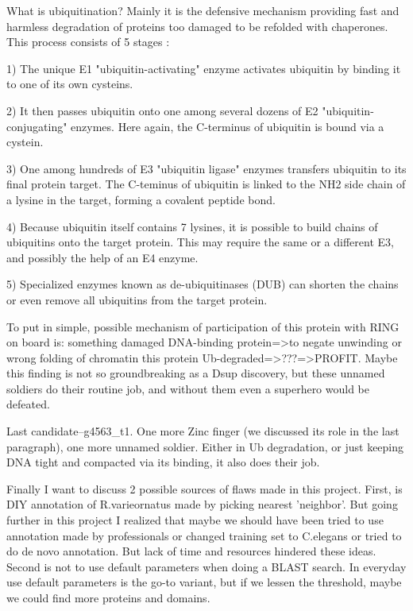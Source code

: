 \documentclass{article}
\begin{document}
 What is ubiquitination? Mainly it is the defensive mechanism providing fast and harmless degradation of proteins too damaged to be refolded with chaperones. This process consists of 5 stages \cite{7}:
 
 1) The unique E1 "ubiquitin-activating" enzyme activates ubiquitin by binding it to one of its own cysteins.
 
 2) It then passes ubiquitin onto one among several dozens of E2 "ubiquitin-conjugating" enzymes. Here again, the C-terminus of ubiquitin is bound via a cystein.
 
 3) One among hundreds of E3 "ubiquitin ligase" enzymes transfers ubiquitin to its final protein target. The C-teminus of ubiquitin is linked to the NH2 side chain of a lysine in the target, forming a covalent peptide bond.
 
 4) Because ubiquitin itself contains 7 lysines, it is possible to build chains of ubiquitins onto the target protein. This may require the same or a different E3, and possibly the help of an E4 enzyme.
 
 5) Specialized enzymes known as de-ubiquitinases (DUB) can shorten the chains or even remove all ubiquitins from the target protein.
 
 To put in simple, possible mechanism of participation of this protein with RING on board is: something damaged DNA-binding protein=>to negate unwinding or wrong folding of chromatin this protein Ub-degraded=>???=>PROFIT. Maybe this finding is not so groundbreaking as a Dsup discovery, but these unnamed soldiers do their routine job, and without them even a superhero would be defeated.
 
 Last candidate--g4563_t1. One more Zinc finger (we discussed its role in the last paragraph), one more unnamed soldier. Either in Ub degradation, or just keeping DNA tight and compacted via its binding, it also does their job.
 
 Finally I want to discuss 2 possible sources of flaws made in this project. First, is DIY annotation of R.varieornatus made by picking nearest 'neighbor'. But going further in this project I realized that maybe we should have been tried to use annotation made by professionals or changed training set to C.elegans or tried to do de novo annotation. But lack of time and resources hindered these ideas. Second is not to use default parameters when doing a BLAST search. In everyday use default parameters is the go-to variant, but if we lessen the threshold, maybe we could find more proteins and domains.
 
\end{document}
